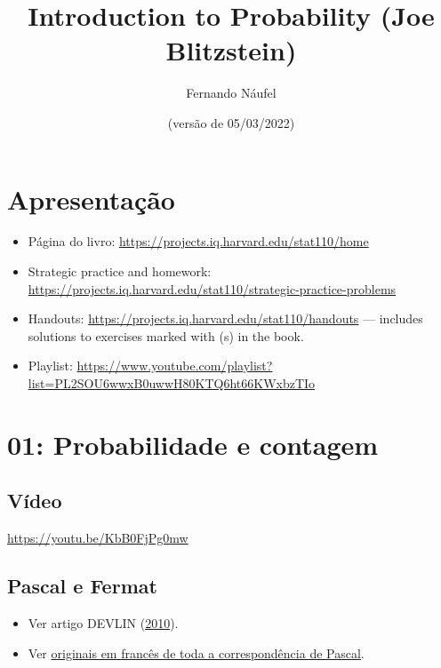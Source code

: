 \documentclass[
  11pt]{report}
\title{Introduction to Probability (Joe Blitzstein)}
\author{Fernando Náufel}
\date{(versão de 05/03/2022)}
\begin{document}
\maketitle

{
\setcounter{tocdepth}{1}
\tableofcontents
}
\hypertarget{apresentauxe7uxe3o}{%
\chapter*{Apresentação}\label{apresentauxe7uxe3o}}

\begin{itemize}
\item
  Página do livro: \url{https://projects.iq.harvard.edu/stat110/home}
\item
  Strategic practice and homework: \url{https://projects.iq.harvard.edu/stat110/strategic-practice-problems}
\item
  Handouts: \url{https://projects.iq.harvard.edu/stat110/handouts} --- includes solutions to exercises marked with (s) in the book.
\item
  Playlist: \url{https://www.youtube.com/playlist?list=PL2SOU6wwxB0uwwH80KTQ6ht66KWxbzTIo}
\end{itemize}

\hypertarget{probabilidade-e-contagem}{%
\chapter*{01: Probabilidade e contagem}\label{probabilidade-e-contagem}}

\hypertarget{vuxeddeo}{%
\section*{Vídeo}\label{vuxeddeo}}

\begin{center} \url{https://youtu.be/KbB0FjPg0mw} \end{center}

\hypertarget{pascal-e-fermat}{%
\section*{Pascal e Fermat}\label{pascal-e-fermat}}

\begin{itemize}
\item
  Ver artigo DEVLIN (\protect\hyperlink{ref-devlin-2010-pascal-fermat}{2010}).
\item
  Ver \href{https://gallica.bnf.fr/ark:/12148/bpt6k69975r.image.r=Blaise+Pascal.f233.langFR}{originais em francês de toda a correspondência de Pascal}.
\end{itemize}
\end{document}
